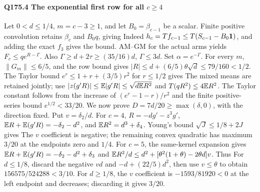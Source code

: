 \paragraph{Q175.4 The exponential first row for all $c\ge\allowbreak 4$}\label{part:Q175.4}
Let $0<\allowbreak d\le\allowbreak 1/4$, $m=\allowbreak c-3\ge\allowbreak 1$, and let $B_0=\allowbreak \beta_{c-1}$ be a scalar.
Finite positive convolution retains $\beta_c$ and $B_0q$, giving
Indeed $h_c=\allowbreak T f_{c-1}\le\allowbreak  T(S_{c-1}-B_0\mathbf1)$, and adding the exact
$f_3$ gives the bound. AM--GM for the actual arms yields
$F_c\le\allowbreak  q e^{R-\Gamma}$.
Also $\Gamma\ge\allowbreak  d+2\tau\ge\allowbreak (35/16)d$, $\Gamma\le\allowbreak 3d$.
Set $\alpha=\allowbreak e^{-\Gamma}$.
For every $m$, $\|G_m\|\le\allowbreak 6/5$, and the row bound gives
$|R|\le\allowbreak  d+(6/5)\theta\sqrt d\le\allowbreak 79/160<\allowbreak 1/2$.
The Taylor bound $e^r\le\allowbreak 1+r+(3/5)r^2$ for $r\le\allowbreak 1/2$ gives
The mixed means are retained jointly; use
$|z(g'R)|\le\allowbreak \mathbb E|g'R|\le\allowbreak \sqrt{d\mathbb E R^2}$ and $T(qR^2)\le\allowbreak 4\mathbb E R^2$.
The Taylor constant follows from the increase of
$(e^r-1-r)/r^2$ and the finite positive-series bound $e^{1/2}<\allowbreak 33/20$.
We now prove $D=\allowbreak 7d/20\ge\allowbreak \max(\delta,\allowbreak 0)$, with the direction fixed.
Put $v=\allowbreak \delta_2/d$.
For $c=\allowbreak 4$, $R=\allowbreak -dg'-z^3g'$, $\mathbb E R+\mathbb E(g'R)=\allowbreak -\delta_2-d^2$,
and $\mathbb E R^2=\allowbreak d^3+\delta_4$. Young's bound $\sqrt J\le\allowbreak 1/8+2J$ gives
The $v$ coefficient is negative; the remaining convex quadratic has
maximum $3/20$ at the endpoints zero and $1/4$.
For $c=\allowbreak 5$, the same-kernel expansion gives
$\mathbb E R+\mathbb E(g'R)=\allowbreak -\delta_2-d^2+\delta_3$ and
$\mathbb E R^2/d\le\allowbreak  d^2+[\theta^2(1+\theta)-2\theta d]v$.
Thus
For $d\le\allowbreak 1/8$, discard the negative $vd$ and $-d+(22/5)d^2$,
then use $v\le\allowbreak \theta$ to obtain $156575/524288<\allowbreak 3/10$.
For $d\ge\allowbreak 1/8$, the $v$ coefficient is $-1593/81920<\allowbreak 0$ at the left
endpoint and decreases; discarding it gives $3/20$.
